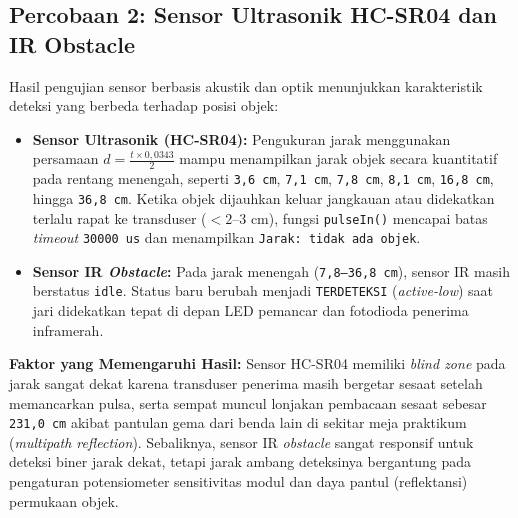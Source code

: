 \subsection{Percobaan 2: Sensor Ultrasonik HC-SR04 dan IR Obstacle}
Hasil pengujian sensor berbasis akustik dan optik menunjukkan karakteristik deteksi yang berbeda terhadap posisi objek:
\begin{itemize}
    \item \textbf{Sensor Ultrasonik (HC-SR04):} Pengukuran jarak menggunakan persamaan $d = \frac{t \times 0,0343}{2}$ mampu menampilkan jarak objek secara kuantitatif pada rentang menengah, seperti \texttt{3,6 cm}, \texttt{7,1 cm}, \texttt{7,8 cm}, \texttt{8,1 cm}, \texttt{16,8 cm}, hingga \texttt{36,8 cm}. Ketika objek dijauhkan keluar jangkauan atau didekatkan terlalu rapat ke transduser ($< 2\text{--}3\text{ cm}$), fungsi \texttt{pulseIn()} mencapai batas \textit{timeout} \texttt{30000 us} dan menampilkan \texttt{Jarak: tidak ada objek}.
    \item \textbf{Sensor IR \textit{Obstacle}:} Pada jarak menengah (\texttt{7,8--36,8 cm}), sensor IR masih berstatus \texttt{idle}. Status baru berubah menjadi \texttt{TERDETEKSI} (\textit{active-low}) saat jari didekatkan tepat di depan LED pemancar dan fotodioda penerima inframerah.
\end{itemize}

\textbf{Faktor yang Memengaruhi Hasil:} Sensor HC-SR04 memiliki \textit{blind zone} pada jarak sangat dekat karena transduser penerima masih bergetar sesaat setelah memancarkan pulsa, serta sempat muncul lonjakan pembacaan sesaat sebesar \texttt{231,0 cm} akibat pantulan gema dari benda lain di sekitar meja praktikum (\textit{multipath reflection}). Sebaliknya, sensor IR \textit{obstacle} sangat responsif untuk deteksi biner jarak dekat, tetapi jarak ambang deteksinya bergantung pada pengaturan potensiometer sensitivitas modul dan daya pantul (reflektansi) permukaan objek.

